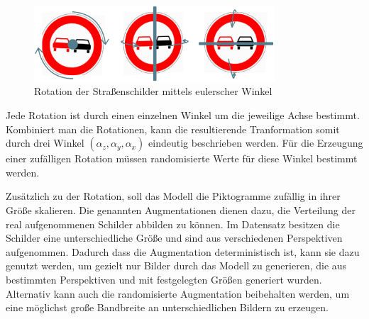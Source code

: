 \begin{figure}[H]
	\centering
	\includegraphics[width=0.8\textwidth]{../images/3 Konzeption des Generative Adversarial Networks/Datenaugmentation/Rotation.png}
	\caption{Rotation der Straßenschilder mittels eulerscher Winkel}
	\label{fig:rotation}
\end{figure}


Jede Rotation ist durch einen einzelnen Winkel um die jeweilige Achse bestimmt. Kombiniert man die Rotationen, kann die resultierende Tranformation somit durch drei Winkel $(\alpha_z, \alpha_y, \alpha_x)$ eindeutig beschrieben werden. Für die Erzeugung einer zufälligen Rotation müssen randomisierte Werte für diese Winkel bestimmt werden. \cite{math-primer}

Zusätzlich zu der Rotation, soll das Modell die Piktogramme zufällig in ihrer Größe skalieren. Die genannten Augmentationen dienen dazu, die Verteilung der real aufgenommenen Schilder abbilden zu können. Im Datensatz besitzen die Schilder eine unterschiedliche Größe und sind aus verschiedenen Perspektiven aufgenommen. Dadurch dass die Augmentation deterministisch ist, kann sie dazu genutzt werden, um gezielt nur Bilder durch das Modell zu generieren, die aus bestimmten Perspektiven und mit festgelegten Größen generiert wurden. Alternativ kann auch die randomisierte Augmentation beibehalten werden, um eine möglichst große Bandbreite an unterschiedlichen Bildern zu erzeugen.

